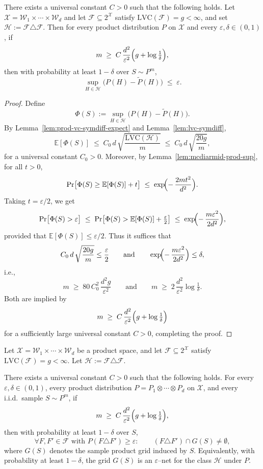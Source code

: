 \documentclass[arxiv]{colt2026}
\newcommand{\X}{\mathcal{X}}
\newcommand{\F}{\mathcal{F}}
\newcommand{\W}{\mathcal{W}}
\newcommand{\Hc}{\mathcal{H}}
\newcommand{\E}{\mathbb{E}}
\newcommand{\eps}{\varepsilon}
\newcommand{\LVC}{\mathrm{LVC}}
\begin{document}
\begin{corollary}[High-probability bound for $\Hc=\F\triangle\F$]
\label{cor:prod-vc-symdiff-highprob-self}
There exists a universal constant $C>0$ such that the following holds.
Let $\X=\W_1\times\cdots\times\W_d$ and let $\F\subseteq 2^\X$ satisfy
$\LVC(\F)=g<\infty$, and set $\Hc:=\F\triangle\F$.
Then for every product distribution $P$ on $\X$ and every $\eps,\delta\in(0,1)$,
if
\[
m \;\ge\; C\,\frac{d^2}{\eps^2}\Bigl(g + \log\tfrac{1}{\delta}\Bigr),
\]
then with probability at least $1-\delta$ over $S\sim P^{m}$,
\[
\sup_{H\in\Hc}\bigl(P(H)-\tilde P(H)\bigr)\;\le\;\eps.
\]
\end{corollary}

\begin{proof}
Define
\[
\Phi(S):=\sup_{H\in\Hc}\bigl(P(H)-\tilde P(H)\bigr).
\]
By Lemma~\ref{lem:prod-vc-symdiff-expect} and Lemma~\ref{lem:lvc-symdiff},
\[
\E[\Phi(S)]
\;\le\;
C_0\,d\,\sqrt{\frac{\LVC(\Hc)}{m}}
\;\le\;
C_0\,d\,\sqrt{\frac{20g}{m}},
\]
for a universal constant $C_0>0$.
Moreover, by Lemma~\ref{lem:mcdiarmid-prod-sup},
for all $t>0$,
\[
\Pr\bigl[\Phi(S)\ge \E[\Phi(S)] + t\bigr]
\;\le\;
\exp\!\Bigl(-\,\frac{2mt^2}{d^2}\Bigr).
\]
Taking $t=\eps/2$, we get
\[
\Pr\bigl[\Phi(S)>\eps\bigr]
\;\le\;
\Pr\bigl[\Phi(S)>\E[\Phi(S)]+\tfrac{\eps}{2}\bigr]
\;\le\;
\exp\!\Bigl(-\,\frac{m\eps^2}{2d^2}\Bigr),
\]
provided that $\E[\Phi(S)]\le \eps/2$.
Thus it suffices that
\[
C_0\,d\,\sqrt{\frac{20g}{m}}\le \frac{\eps}{2}
\qquad\text{and}\qquad
\exp\!\Bigl(-\,\frac{m\eps^2}{2d^2}\Bigr)\le \delta,
\]
i.e.,
\[
m \;\ge\; 80\,C_0^2\,\frac{d^2 g}{\eps^2}
\qquad\text{and}\qquad
m \;\ge\; 2\,\frac{d^2}{\eps^2}\log\tfrac{1}{\delta}.
\]
Both are implied by
\[
m \;\ge\; C\,\frac{d^2}{\eps^2}\Bigl(g+\log\tfrac{1}{\delta}\Bigr)
\]
for a sufficiently large universal constant $C>0$, completing the proof.
\end{proof}
\begin{lemma}
\label{lem:hitting-FDeltaF-LVC}
Let $\X=\W_1\times\cdots\times\W_d$ be a product space, and let
$\F\subseteq 2^\X$ satisfy $\LVC(\F)=g<\infty$.
Let $\Hc:=\F\triangle\F$.

There exists a universal constant $C>0$ such that the following holds.
For every $\eps,\delta\in(0,1)$, every product distribution
$P=P_1\otimes\cdots\otimes P_d$ on $\X$, and every i.i.d.\ sample
$S\sim P^{m}$, if
\[
m \;\ge\; C\,\frac{d^2}{\eps^2}\Bigl(g+\log\tfrac{1}{\delta}\Bigr),
\]
then with probability at least $1-\delta$ over $S$,
\[
\forall F,F'\in\F \text{ with } P(F\triangle F')\ge\eps:
\qquad
(F\triangle F')\cap G(S)\neq\emptyset,
\]
where $G(S)$ denotes the sample product grid induced by $S$.
Equivalently, with probability at least $1-\delta$, the grid $G(S)$ is an
$\eps$--net for the class $\Hc$ under $P$.
\end{lemma}
\end{document}
